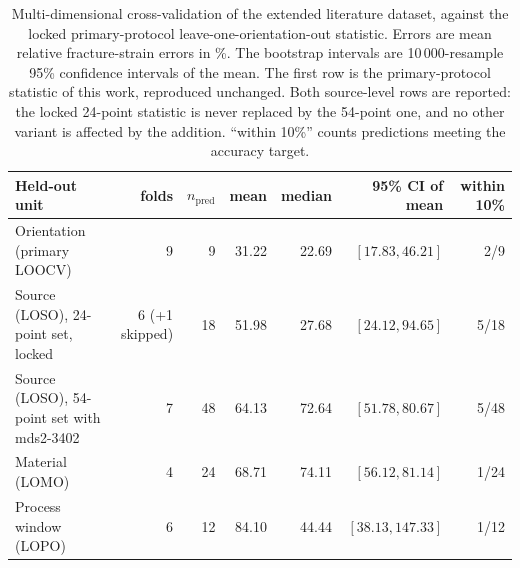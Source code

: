 \documentclass[12pt,a4paper,twocolumn]{article}
\begin{document}
\begin{table}[htbp]
\centering
\caption{Multi-dimensional cross-validation of the extended literature dataset, against the locked primary-protocol leave-one-orientation-out statistic. Errors are mean relative fracture-strain errors in \%. The bootstrap intervals are 10\,000-resample 95\% confidence intervals of the mean. The first row is the primary-protocol statistic of this work, reproduced unchanged. Both source-level rows are reported: the locked 24-point statistic is never replaced by the 54-point one, and no other variant is affected by the addition. ``within 10\%'' counts predictions meeting the accuracy target.}
\label{tab:cv_variants}
\footnotesize
\setlength{\tabcolsep}{3pt}
\begin{tabular}{p{}rrrrrr}
\toprule
\textbf{Held-out unit} & \textbf{folds} & \textbf{$n_{\mathrm{pred}}$} & \textbf{mean} & \textbf{median} & \textbf{95\% CI of mean} & \textbf{within 10\%} \\
\midrule
Orientation (primary LOOCV) & 9 & 9 & 31.22 & 22.69 & $[17.83, 46.21]$ & 2/9 \\
Source (LOSO), 24-point set, locked & 6 (+1 skipped) & 18 & 51.98 & 27.68 & $[24.12, 94.65]$ & 5/18 \\
Source (LOSO), 54-point set with mds2-3402 & 7 & 48 & 64.13 & 72.64 & $[51.78, 80.67]$ & 5/48 \\
Material (LOMO) & 4 & 24 & 68.71 & 74.11 & $[56.12, 81.14]$ & 1/24 \\
Process window (LOPO) & 6 & 12 & 84.10 & 44.44 & $[38.13, 147.33]$ & 1/12 \\
\bottomrule
\end{tabular}
\end{table}
\end{document}
